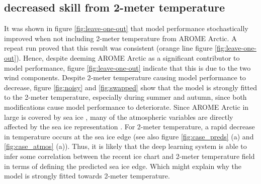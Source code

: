 \documentclass[../main/thesis]{subfiles}
\begin{document}
\subsection{decreased skill from 2-meter temperature}
\label{sec:discuss_seggrad_t2m}
It was shown in figure \ref{fig:leave-one-out} that model performance stochastically improved when not including 2-meter temperature from AROME Arctic. A repeat run proved that this result was consistent (orange line figure \ref{fig:leave-one-out}). Hence, despite deeming AROME Arctic as a significant contributor to model performance, figure \ref{fig:leave-one-out} indicate that this is due to the two wind components. Despite 2-meter temperature causing model performance to decrease, figure \ref{fig:noisy} and \ref{fig:swapped} show that the model is strongly fitted to the 2-meter temperature, especially during summer and autumn, since both modifications cause model performance to deteriorate. Since AROME Arctic in large is covered by sea ice \citep{Mueller2017}, many of the atmospheric variables are directly affected by the sea ice representation \citep{Mueller2017, Batrak2018, Batrak2019, Mueller2023}. For 2-meter temperature, a rapid decrease in temperature occurs at the sea ice edge \citep{Mueller2023} (see also figure \ref{fig:case_preds} (a) and \ref{fig:case_atmos} (a)). Thus, it is likely that the deep learning system is able to infer some correlation between the recent ice chart and 2-meter temperature field in terms of defining the predicted sea ice edge. Which might explain why the model is strongly fitted towards 2-meter temperature. 
\end{document}
